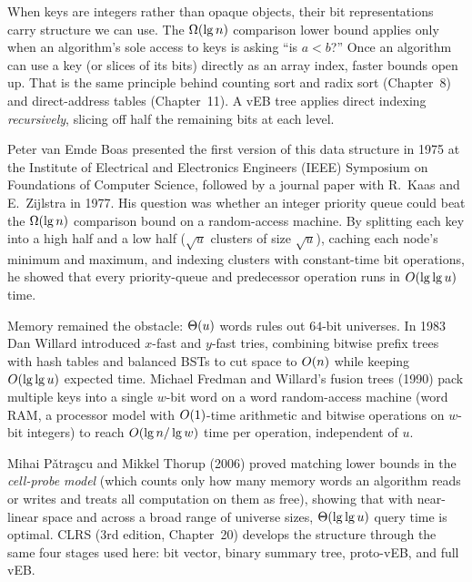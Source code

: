 \begin{aestheticbox}
When keys are integers rather than opaque objects, their bit representations carry structure we can use. The $\Omega(\lg n)$ comparison lower bound applies only
when an algorithm's sole access to keys is asking ``is $a < b$?'' Once an algorithm can
use a key (or slices of its bits) directly as an array index, faster bounds open up. That is the same principle behind counting sort and radix sort (Chapter~8) and
direct-address tables (Chapter~11). A vEB tree applies direct indexing \emph{recursively}, slicing off half the remaining bits at each level.
\end{aestheticbox}

\begin{historybox}
Peter van Emde Boas presented the first version of this data structure in 1975 at the Institute of Electrical and Electronics Engineers (IEEE) Symposium on Foundations of Computer Science, followed by a journal paper with R.~Kaas and E.~Zijlstra in 1977. His question was whether an integer priority queue could beat the $\Omega(\lg n)$ comparison bound on a random-access machine. By splitting each key into a high half and a low half ($\sqrt{u}$ clusters of size $\sqrt{u}$), caching each node's minimum and maximum, and indexing clusters with constant-time bit operations, he showed that every priority-queue and predecessor operation runs in $O(\lg \lg u)$ time.

Memory remained the obstacle: $\Theta(u)$ words rules out $64$-bit universes. In 1983 Dan Willard introduced $x$-fast and $y$-fast tries, combining bitwise prefix trees with hash tables and balanced BSTs to cut space to $O(n)$ while keeping $O(\lg \lg u)$ expected time. Michael Fredman and Willard's fusion trees (1990) pack multiple keys into a single $w$-bit word on a word random-access machine (word RAM, a processor model with $O(1)$-time arithmetic and bitwise operations on $w$-bit integers) to reach $O(\lg n / \lg w)$ time per operation, independent of $u$.

Mihai P\v{a}tra\c{s}cu and Mikkel Thorup (2006) proved matching lower bounds in the \emph{cell-probe model} (which counts only how many memory words an algorithm reads or writes and treats all computation on them as free), showing that with near-linear space and across a broad range of universe sizes, $\Theta(\lg\lg u)$ query time is optimal. CLRS (3rd edition, Chapter~20) develops the structure through the same four stages used here: bit vector, binary summary tree, proto-vEB, and full vEB.
\end{historybox}

